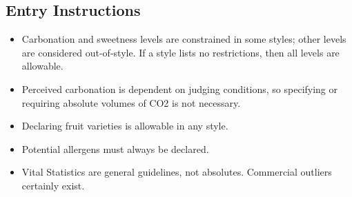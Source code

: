 \subsection*{Entry Instructions}

\begin{itemize}
\item Carbonation and sweetness levels are constrained in some styles; other levels are considered out-of-style. If a style lists no restrictions, then all levels are allowable.
\item Perceived carbonation is dependent on judging conditions, so specifying or requiring absolute volumes of CO2 is not necessary.
\item Declaring fruit varieties is allowable in any style.
\item Potential allergens must always be declared.
\item Vital Statistics are general guidelines, not absolutes. Commercial outliers certainly exist.
\end{itemize}